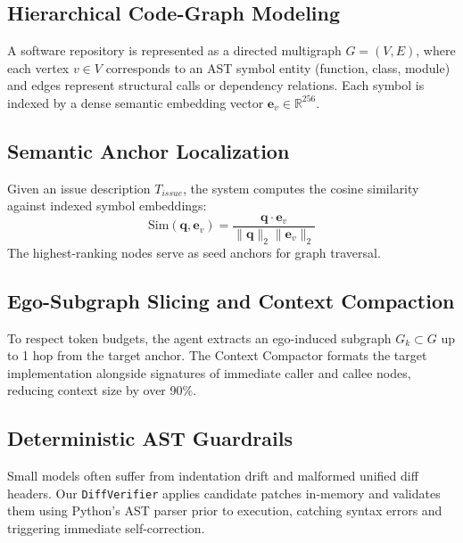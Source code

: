 \documentclass[11pt,a4paper]{article}
\begin{document}
\subsection{Hierarchical Code-Graph Modeling}
A software repository is represented as a directed multigraph $G = (V, E)$, where each vertex $v \in V$ corresponds to an AST symbol entity (function, class, module) and edges represent structural calls or dependency relations. Each symbol is indexed by a dense semantic embedding vector $\mathbf{e}_v \in \mathbb{R}^{256}$.

\subsection{Semantic Anchor Localization}
Given an issue description $T_{issue}$, the system computes the cosine similarity against indexed symbol embeddings:
\begin{equation}
\text{Sim}(\mathbf{q}, \mathbf{e}_v) = \frac{\mathbf{q} \cdot \mathbf{e}_v}{\|\mathbf{q}\|_2 \|\mathbf{e}_v\|_2}
\end{equation}
The highest-ranking nodes serve as seed anchors for graph traversal.

\subsection{Ego-Subgraph Slicing and Context Compaction}
To respect token budgets, the agent extracts an ego-induced subgraph $G_k \subset G$ up to 1 hop from the target anchor. The Context Compactor formats the target implementation alongside signatures of immediate caller and callee nodes, reducing context size by over 90\%.

\subsection{Deterministic AST Guardrails}
Small models often suffer from indentation drift and malformed unified diff headers. Our \texttt{DiffVerifier} applies candidate patches in-memory and validates them using Python's AST parser prior to execution, catching syntax errors and triggering immediate self-correction.
\end{document}
